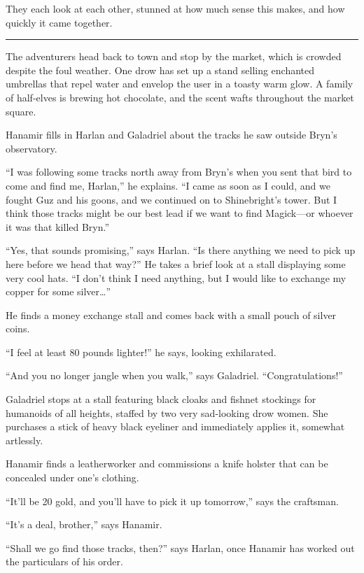 \documentclass[smalldemyvopaper,11pt,twoside,onecolumn,openright,extrafontsizes]{memoir}
\begin{document}
They each look at each other, stunned at how much sense this makes, and
how quickly it came together.

\begin{center}\rule{0.5\linewidth}{\linethickness}\end{center}

The adventurers head back to town and stop by the market, which is
crowded despite the foul weather. One drow has set up a stand selling
enchanted umbrellas that repel water and envelop the user in a toasty
warm glow. A family of half-elves is brewing hot chocolate, and the
scent wafts throughout the market square.

Hanamir fills in Harlan and Galadriel about the tracks he saw outside
Bryn's observatory.

``I was following some tracks north away from Bryn's when you sent that
bird to come and find me, Harlan,'' he explains. ``I came as soon as I
could, and we fought Guz and his goons, and we continued on to
Shinebright's tower. But I think those tracks might be our best lead if
we want to find Magick---or whoever it was that killed Bryn.''

``Yes, that sounds promising,'' says Harlan. ``Is there anything we need
to pick up here before we head that way?'' He takes a brief look at a
stall displaying some very cool hats. ``I don't think I need anything,
but I would like to exchange my copper for some silver\ldots{}''

He finds a money exchange stall and comes back with a small pouch of
silver coins.

``I feel at least 80 pounds lighter!'' he says, looking exhilarated.

``And you no longer jangle when you walk,'' says Galadriel.
``Congratulations!''

Galadriel stops at a stall featuring black cloaks and fishnet stockings
for humanoids of all heights, staffed by two very sad-looking drow
women. She purchases a stick of heavy black eyeliner and immediately
applies it, somewhat artlessly.

Hanamir finds a leatherworker and commissions a knife holster that can
be concealed under one's clothing.

``It'll be 20 gold, and you'll have to pick it up tomorrow,'' says the
craftsman.

``It's a deal, brother,'' says Hanamir.

``Shall we go find those tracks, then?'' says Harlan, once Hanamir has
worked out the particulars of his order.
\end{document}
